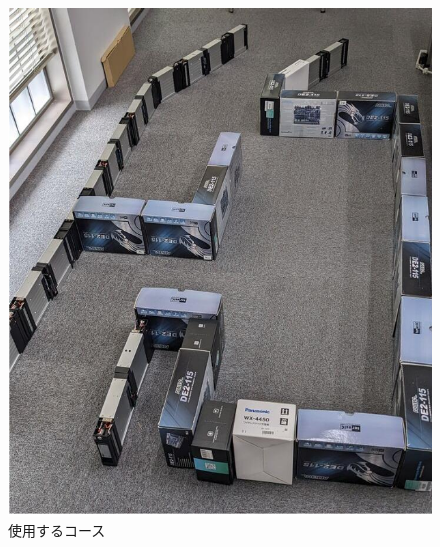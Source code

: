 \documentclass{ltjsarticle} %
\begin{document}
\begin{figure}[H]
\begin{minipage}{0.45\textwidth}
    \includegraphics[width=\textwidth]{road.png} %
    \caption{使用するコース} %
    \label{fig:road} %
  \end{minipage}
\end{figure}
\end{document}
